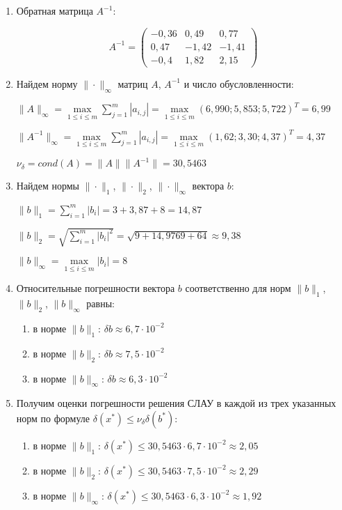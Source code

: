 \documentclass[a4paper,12pt]{article} %
\begin{document}
\begin{enumerate}

\item Обратная матрица $A^{-1}$:

\begin{equation*}
    A^{-1} = 
    \begin{pmatrix}
        -0,36 & 0,49 & 0,77 \\
        0,47 & -1,42 & -1,41 \\
        -0,4 & 1,82 & 2,15
    \end{pmatrix}
\end{equation*}

\item Найдем норму $\|\cdot\|_\infty$ матриц $A$, $A^{-1}$ и число обусловленности:

$\|A\|_\infty = \max\limits_{{1 \leq i \leq m}} \sum\limits_{j = 1}^{m}|a_{i, j}| = \max\limits_{{1 \leq i \leq m}} (6,990; 5,853; 5,722)^T = 6,99$

$\|A^{-1}\|_\infty = \max\limits_{{1 \leq i \leq m}} \sum\limits_{j = 1}^{m}|a_{i, j}| = \max\limits_{{1 \leq i \leq m}} (1,62; 3,30; 4,37)^T = 4,37$

$\nu_\delta = cond(A) = \|A\|\|A^{-1}\| = 30,5463$

\item Найдем нормы $\|\cdot\|_1$, $\|\cdot\|_2$, $\|\cdot\|_\infty$ вектора $b$:

$\|b\|_1 = \sum\limits_{i = 1}^{m}|b_i| = 3 + 3,87 + 8 = 14,87$

$\|b\|_2 = \sqrt{\sum\limits_{i = 1}^{m}|b_i|^2} = \sqrt{9 + 14,9769 + 64} \approx 9,38$

$\|b\|_\infty = \max\limits_{{1 \leq i \leq m}}|b_i| = 8$

\newpage

\item Относительные погрешности вектора $b$ соответственно для норм $\|b\|_1$, $\|b\|_2$, $\|b\|_\infty$ равны:

\begin{enumerate}
    \item в норме $\|b\|_1$: $\delta b \approx 6,7 \cdot 10^{-2}$
    \item в норме $\|b\|_2$: $\delta b \approx 7,5 \cdot 10^{-2}$
    \item в норме $\|b\|_\infty$: $\delta b \approx 6,3 \cdot 10^{-2} $
\end{enumerate}

\item Получим оценки погрешности решения СЛАУ в каждой из трех указанных норм по формуле $\delta (x^*) \leq \nu_\delta \delta (b^*)$:

\begin{enumerate}
    \item в норме $\|b\|_1$: $\delta (x^*) \leq 30,5463 \cdot 6,7 \cdot 10^{-2} \approx 2,05$
    \item в норме $\|b\|_2$: $\delta (x^*) \leq 30,5463 \cdot 7,5 \cdot 10^{-2} \approx 2,29$
    \item в норме $\|b\|_\infty$: $\delta (x^*) \leq 30,5463 \cdot 6,3 \cdot 10^{-2} \approx 1,92$
\end{enumerate}


\end{enumerate}
\end{document}
